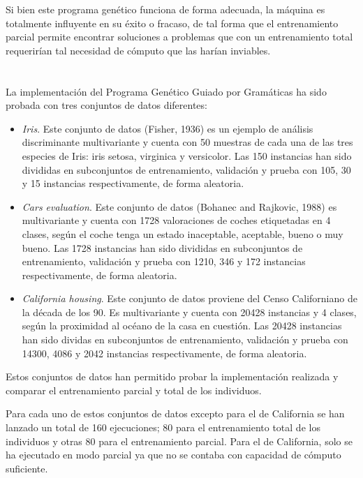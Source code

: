 \documentclass[spanish,a4paper,12pt,twoside]{report}
\begin{document}
  Si bien este programa genético funciona de forma adecuada, la máquina es totalmente influyente en su éxito o fracaso, de tal forma que el entrenamiento parcial permite encontrar soluciones a problemas que con un entrenamiento total requerirían tal necesidad de cómputo que las harían inviables.
  
  \newpage\cleardoublepage

  \chapter{\vspace{-3cm}{\LARGE 7. Resultados}}
  \setcounter{figure}{16}
  \vspace{-1cm}
  La implementación del Programa Genético Guiado por Gramáticas ha sido probada con tres conjuntos de datos diferentes:
  \begin{itemize}
    \item \emph{Iris}. Este conjunto de datos (Fisher, 1936) es un ejemplo de análisis discriminante multivariante y cuenta con 50 muestras de cada una de las tres especies de Iris: iris setosa, virginica y versicolor. Las 150 instancias han sido divididas en subconjuntos de entrenamiento, validación y prueba con 105, 30 y 15 instancias respectivamente, de forma aleatoria.
    \item \emph{Cars evaluation}. Este conjunto de datos (Bohanec and Rajkovic, 1988) es multivariante y cuenta con 1728 valoraciones de coches etiquetadas en 4 clases, según el coche tenga un estado inaceptable, aceptable, bueno o muy bueno. Las 1728 instancias han sido divididas en subconjuntos de entrenamiento, validación y prueba con 1210, 346 y 172 instancias respectivamente, de forma aleatoria.
    \item \emph{California housing}. Este conjunto de datos proviene del Censo Californiano de la década de los 90. Es multivariante y cuenta con 20428 instancias y 4 clases, según la proximidad al océano de la casa en cuestión. Las 20428 instancias han sido dividas en subconjuntos de entrenamiento, validación y prueba con 14300, 4086 y 2042 instancias respectivamente, de forma aleatoria.
  \end{itemize} \par
  Estos conjuntos de datos han permitido probar la implementación realizada y comparar el entrenamiento parcial y total de los individuos. \par
  Para cada uno de estos conjuntos de datos excepto para el de California se han lanzado un total de 160 ejecuciones; 80 para el entrenamiento total de los individuos y otras 80 para el entrenamiento parcial. Para el de California, solo se ha ejecutado en modo parcial ya que no se contaba con capacidad de cómputo suficiente. \par
\end{document}
